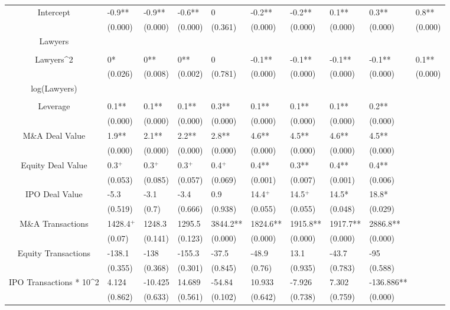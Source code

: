 \documentclass{article}
\begin{document}
\begin{table}[H]
\begin{tabular}{|clllllllll|}
Intercept & -0.9** & -0.9** & -0.6** & 0 & -0.2** & -0.2** & 0.1** & 0.3** & 0.8** \\
   & (0.000) & (0.000) & (0.000) & (0.361) & (0.000) & (0.000) & (0.000) & (0.000) & (0.000) \\
  Lawyers &  &  &  &  &  &  &  &  &  \\
   &  &  &  &  &  &  &  &  &  \\
  Lawyers^2 & 0* & 0** & 0** & 0 & -0.1** & -0.1** & -0.1** & -0.1** & 0.1** \\
   & (0.026) & (0.008) & (0.002) & (0.781) & (0.000) & (0.000) & (0.000) & (0.000) & (0.000) \\
  log(Lawyers) &  &  &  &  &  &  &  &  &  \\
   &  &  &  &  &  &  &  &  &  \\
  Leverage & 0.1** & 0.1** & 0.1** & 0.3** & 0.1** & 0.1** & 0.1** & 0.2** &  \\
   & (0.000) & (0.000) & (0.000) & (0.000) & (0.000) & (0.000) & (0.000) & (0.000) &  \\
  M\&A Deal Value & 1.9** & 2.1** & 2.2** & 2.8** & 4.6** & 4.5** & 4.6** & 4.5** &  \\
   & (0.000) & (0.000) & (0.000) & (0.000) & (0.000) & (0.000) & (0.000) & (0.000) &  \\
  Equity Deal Value & 0.3$^{+}$ & 0.3$^{+}$ & 0.3$^{+}$ & 0.4$^{+}$ & 0.4** & 0.3** & 0.4** & 0.4** &  \\
   & (0.053) & (0.085) & (0.057) & (0.069) & (0.001) & (0.007) & (0.001) & (0.006) &  \\
  IPO Deal Value & -5.3 & -3.1 & -3.4 & 0.9 & 14.4$^{+}$ & 14.5$^{+}$ & 14.5* & 18.8* &  \\
   & (0.519) & (0.7) & (0.666) & (0.938) & (0.055) & (0.055) & (0.048) & (0.029) &  \\
  M\&A Transactions & 1428.4$^{+}$ & 1248.3 & 1295.5 & 3844.2** & 1824.6** & 1915.8** & 1917.7** & 2886.8** &  \\
   & (0.07) & (0.141) & (0.123) & (0.000) & (0.000) & (0.000) & (0.000) & (0.000) &  \\
  Equity Transactions & -138.1 & -138 & -155.3 & -37.5 & -48.9 & 13.1 & -43.7 & -95 &  \\
   & (0.355) & (0.368) & (0.301) & (0.845) & (0.76) & (0.935) & (0.783) & (0.588) &  \\
  IPO Transactions * 10^2 & 4.124 & -10.425 & 14.689 & -54.84 & 10.933 & -7.926 & 7.302 & -136.886** &  \\
   & (0.862) & (0.633) & (0.561) & (0.102) & (0.642) & (0.738) & (0.759) & (0.000) &  \\

\end{tabular}
\end{table}
\end{document}
